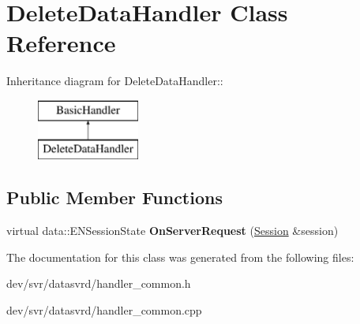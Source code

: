 \hypertarget{classDeleteDataHandler}{
\section{DeleteDataHandler Class Reference}
\label{classDeleteDataHandler}
}
Inheritance diagram for DeleteDataHandler::\begin{figure}[H]
\begin{center}
\leavevmode
\includegraphics[height=2cm]{classDeleteDataHandler}
\end{center}
\end{figure}
\subsection*{Public Member Functions}
\begin{DoxyCompactItemize}
\item 
\hypertarget{classDeleteDataHandler_aec2dd69c5327546e7f717e329ab2b8ec}{
virtual data::ENSessionState {\bfseries OnServerRequest} (\hyperlink{classSession}{Session} \&session)}
\label{classDeleteDataHandler_aec2dd69c5327546e7f717e329ab2b8ec}

\end{DoxyCompactItemize}


The documentation for this class was generated from the following files:\begin{DoxyCompactItemize}
\item 
dev/svr/datasvrd/handler\_\-common.h\item 
dev/svr/datasvrd/handler\_\-common.cpp\end{DoxyCompactItemize}
